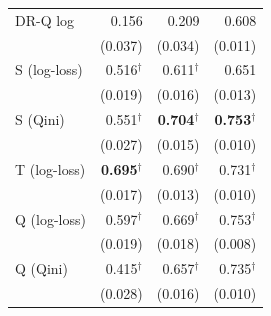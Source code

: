 \documentclass{article}
\begin{document}
\begin{table}[H]
\begin{tabular}{l|rrr}
DR-Q log & 0.156 & 0.209 & 0.608 \\
 & \scriptsize (0.037) & \scriptsize (0.034) & \scriptsize (0.011) \\[2pt]
\hline
S (log-loss) & 0.516$^\dagger$ & 0.611$^\dagger$ & 0.651 \\
 & \scriptsize (0.019) & \scriptsize (0.016) & \scriptsize (0.013) \\[2pt]
S (Qini) & 0.551$^\dagger$ & \textbf{0.704}$^\dagger$ & \textbf{0.753}$^\dagger$ \\
 & \scriptsize (0.027) & \scriptsize (0.015) & \scriptsize (0.010) \\[2pt]
T (log-loss) & \textbf{0.695}$^\dagger$ & 0.690$^\dagger$ & 0.731$^\dagger$ \\
 & \scriptsize (0.017) & \scriptsize (0.013) & \scriptsize (0.010) \\[2pt]
Q (log-loss) & 0.597$^\dagger$ & 0.669$^\dagger$ & 0.753$^\dagger$ \\
 & \scriptsize (0.019) & \scriptsize (0.018) & \scriptsize (0.008) \\[2pt]
Q (Qini) & 0.415$^\dagger$ & 0.657$^\dagger$ & 0.735$^\dagger$ \\
 & \scriptsize (0.028) & \scriptsize (0.016) & \scriptsize (0.010) \\[2pt]
\hline
\end{tabular}
\end{table}
\end{document}

